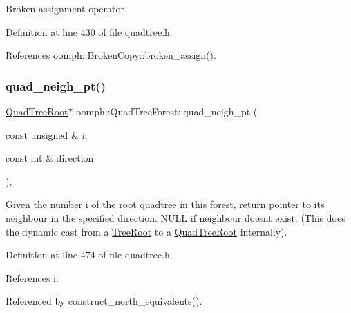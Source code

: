 Broken assignment operator. 



Definition at line 430 of file quadtree.\+h.



References oomph\+::\+Broken\+Copy\+::broken\+\_\+assign().

\mbox{\label{classoomph_1_1QuadTreeForest_a4437bebe3b3920619199b9abd3958049}} 
\subsubsection{\texorpdfstring{quad\+\_\+neigh\+\_\+pt()}{quad\_neigh\_pt()}}
{\footnotesize\ttfamily \hyperlink{classoomph_1_1QuadTreeRoot}{Quad\+Tree\+Root}$\ast$ oomph\+::\+Quad\+Tree\+Forest\+::quad\+\_\+neigh\+\_\+pt (\begin{DoxyParamCaption}\item[{const unsigned \&}]{i,  }\item[{const int \&}]{direction }\end{DoxyParamCaption})\hspace{0.3cm}{\ttfamily [inline]}, {\ttfamily [private]}}



Given the number i of the root quadtree in this forest, return pointer to its neighbour in the specified direction. N\+U\+LL if neighbour doesn\textquotesingle{}t exist. (This does the dynamic cast from a \hyperlink{classoomph_1_1TreeRoot}{Tree\+Root} to a \hyperlink{classoomph_1_1QuadTreeRoot}{Quad\+Tree\+Root} internally). 



Definition at line 474 of file quadtree.\+h.



References i.



Referenced by construct\+\_\+north\+\_\+equivalents().

\mbox{\label{classoomph_1_1QuadTreeForest_a2bca62b0121338eb8c7c159df8c23f19}} 
